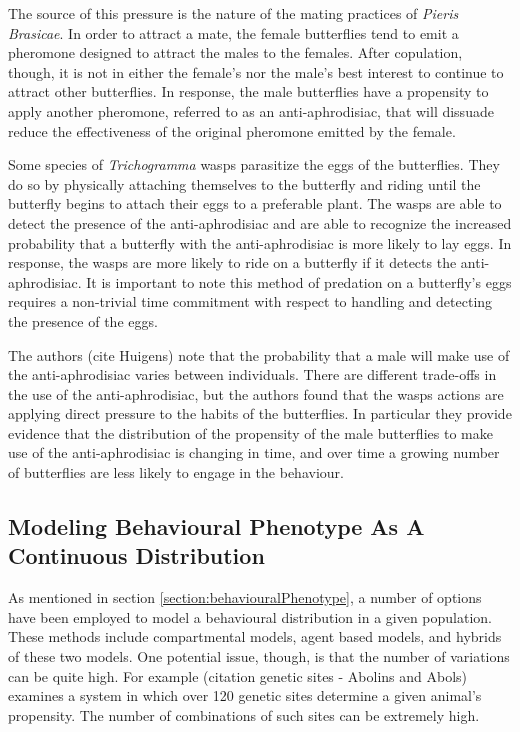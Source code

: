 \documentclass[12pt]{article}
\begin{document}
The source of this pressure is the nature of the mating practices of
\textit{Pieris Brasicae}. In order to attract a mate, the female
butterflies tend to emit a pheromone designed to attract the males to
the females. After copulation, though, it is not in either the
female's nor the male's best interest to continue to attract other
butterflies. In response, the male butterflies have a propensity to
apply another pheromone, referred to as an anti-aphrodisiac, that will
dissuade reduce the effectiveness of the original pheromone emitted by
the female.

Some species of \textit{Trichogramma} wasps parasitize the eggs of the
butterflies. They do so by physically attaching themselves to the
butterfly and riding until the butterfly begins to attach their eggs
to a preferable plant. The wasps are able to detect the presence of
the anti-aphrodisiac and are able to recognize the increased
probability that a butterfly with the anti-aphrodisiac is more likely
to lay eggs. In response, the wasps are more likely to ride on a
butterfly if it detects the anti-aphrodisiac. It is important to note
this method of predation on a butterfly's eggs requires a non-trivial
time commitment with respect to handling and detecting the presence of
the eggs.

The authors (cite Huigens) note that the probability that a male will
make use of the anti-aphrodisiac varies between individuals. There are
different trade-offs in the use of the anti-aphrodisiac, but the
authors found that the wasps actions are applying direct pressure to
the habits of the butterflies. In particular they provide evidence
that the distribution of the propensity of the male butterflies to
make use of the anti-aphrodisiac is changing in time, and over time a
growing number of butterflies are less likely to engage in the
behaviour.

\subsection{Modeling Behavioural Phenotype As A Continuous
  Distribution}

As mentioned in section \ref{section:behaviouralPhenotype}, a number
of options have been employed to model a behavioural distribution in a
given population. These methods include compartmental models, agent
based models, and hybrids of these two models. One potential issue,
though, is that the number of variations can be quite high. For
example (citation genetic sites - Abolins and Abols) examines a system
in which over 120 genetic sites determine a given animal's
propensity. The number of combinations of such sites can be extremely
high.
\end{document}
